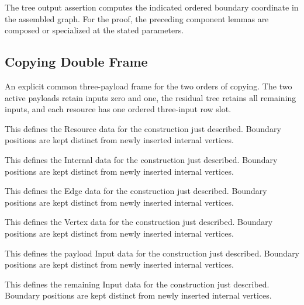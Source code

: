 The tree output assertion computes the indicated ordered boundary coordinate in the assembled graph.
For the proof, the preceding component lemmas are composed or specialized at the stated parameters.
\par{}

\subsection{Copying Double Frame}
An explicit common three-payload frame for the two orders of copying. The two active payloads retain inputs zero and one, the residual tree retains all remaining inputs, and each resource has one ordered three-input row slot.

This defines the Resource data for the construction just described. Boundary positions are kept distinct from newly inserted internal vertices.
\par{}

This defines the Internal data for the construction just described. Boundary positions are kept distinct from newly inserted internal vertices.
\par{}

This defines the Edge data for the construction just described. Boundary positions are kept distinct from newly inserted internal vertices.
\par{}

This defines the Vertex data for the construction just described. Boundary positions are kept distinct from newly inserted internal vertices.
\par{}

This defines the payload Input data for the construction just described. Boundary positions are kept distinct from newly inserted internal vertices.
\par{}

This defines the remaining Input data for the construction just described. Boundary positions are kept distinct from newly inserted internal vertices.
\par{}

